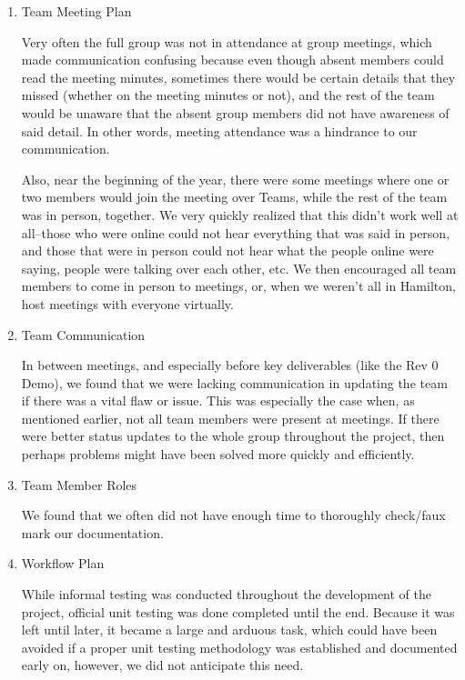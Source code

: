 \documentclass{article}
\begin{document}

\begin{enumerate}
    \item{Team Meeting Plan}

    Very often the full group was not in attendance at group meetings, which made communication confusing because even though absent members could read the meeting minutes, sometimes there would be certain details that they missed (whether on the meeting minutes or not), and the rest of the team would be unaware that the absent group members did not have awareness of said detail. In other words, meeting attendance was a hindrance to our communication. 

    Also, near the beginning of the year, there were some meetings where one or two members would join the meeting over Teams, while the rest of the team was in person, together. We very quickly realized that this didn't work well at all--those who were online could not hear everything that was said in person, and those that were in person could not hear what the people online were saying, people were talking over each other, etc. We then encouraged all team members to come in person to meetings, or, when we weren't all in Hamilton, host meetings with everyone virtually.

    \item{Team Communication}

    In between meetings, and especially before key deliverables (like the Rev 0 Demo), we found that we were lacking communication in updating the team if there was a vital flaw or issue. This was especially the case when, as mentioned earlier, not all team members were present at meetings. If there were better status updates to the whole group throughout the project, then perhaps problems might have been solved more quickly and efficiently.

    \item{Team Member Roles}

    We found that we often did not have enough time to thoroughly check/faux mark our documentation.  

    \item{Workflow Plan}

    While informal testing was conducted throughout the development of the project, official unit testing was done completed until the end. Because it was left until later, it became a large and arduous task, which could have been avoided if a proper unit testing methodology was established and documented early on, however, we did not anticipate this need. 
    
\end{enumerate}
\end{document}
